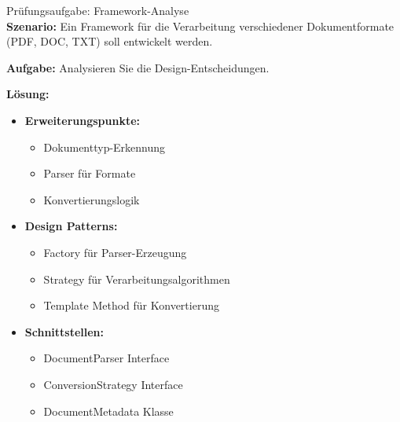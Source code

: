 \begin{example2}{Prüfungsaufgabe: Framework-Analyse}\\
\textbf{Szenario:}
Ein Framework für die Verarbeitung verschiedener Dokumentformate (PDF, DOC, TXT) 
soll entwickelt werden.

\textbf{Aufgabe:}
Analysieren Sie die Design-Entscheidungen.

\textbf{Lösung:}
\begin{itemize}
    \item \textbf{Erweiterungspunkte:}
    \begin{itemize}
        \item Dokumenttyp-Erkennung
        \item Parser für Formate
        \item Konvertierungslogik
    \end{itemize}
    
    \item \textbf{Design Patterns:}
    \begin{itemize}
        \item Factory für Parser-Erzeugung
        \item Strategy für Verarbeitungsalgorithmen
        \item Template Method für Konvertierung
    \end{itemize}
    
    \item \textbf{Schnittstellen:}
    \begin{itemize}
        \item DocumentParser Interface
        \item ConversionStrategy Interface
        \item DocumentMetadata Klasse
    \end{itemize}
\end{itemize}
\end{example2}